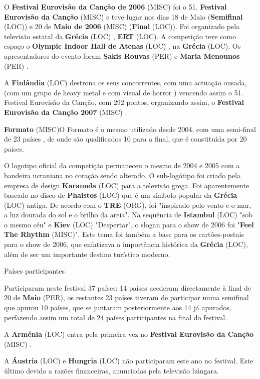 \documentclass[12pt,a4paper]{article}
\begin{document}
O \textbf{Festival Eurovisão da Canção de 2006} (MISC) foi o 51. \textbf{Festival Eurovisão da Canção} (MISC) e teve lugar nos dias 18 de Maio (\textbf{Semifinal} (LOC)) e 20 de \textbf{Maio de 2006} (MISC) (\textbf{Final} (LOC)). Foi organizado pela televisão estatal da \textbf{Grécia} (LOC) , \textbf{ERT} (LOC). A competição teve como espaço o \textbf{Olympic Indoor Hall de Atenas} (LOC) , na \textbf{Grécia} (LOC). Os apresentadores do evento foram \textbf{Sakis Rouvas} (PER) e \textbf{Maria Menounos} (PER) .

A \textbf{Finlândia} (LOC) destrona os seus concorrentes, com uma actuação ousada, (com um grupo de heavy metal e com visual de horror ) vencendo assim o 51. Festival Eurovisão da Canção, com 292 pontos, organizando assim, o \textbf{Festival Eurovisão da Canção 2007} (MISC) .



\textbf{Formato} (MISC)O Formato é o mesmo utilizado desde 2004, com uma semi-final de 23 países , de onde são qualificados 10 para a final, que é constituída por 20 países.

O logotipo oficial da competição permaneceu o mesmo de 2004 e 2005 com a bandeira ucraniana no coração sendo alterado. O sub-logótipo foi criado pela empresa de design \textbf{Karamela} (LOC) para a televisão grega. Foi aparentemente baseado no disco de \textbf{Phaistos} (LOC) que é um símbolo popular da \textbf{Grécia} (LOC) antiga. De acordo com o \textbf{TRE} (ORG), foi "inspirado pelo vento e o mar, a luz dourada do sol e o brilho da areia". Na sequência de \textbf{Istambul} (LOC) "sob o mesmo céu" e \textbf{Kiev} (LOC) "Despertar", o slogan para o show de 2006 foi "\textbf{Feel The Rhythm} (MISC)". Este tema foi também a base para os cartões-postais para o show de 2006, que enfatizava a importância histórica da \textbf{Grécia} (LOC), além de ser um importante destino turístico moderno.



Países participantes

Participaram neste festival 37 países: 14 países acederam directamente à final de 20 de \textbf{Maio} (PER), os restantes 23 países tiveram de participar numa semifinal que apurou 10 países, que se juntaram posteriormente aos 14 já apurados, perfazendo assim um total de 24 países participantes na final do festival.

A \textbf{Arménia} (LOC) entra pela primeira vez no \textbf{Festival Eurovisão da Canção} (MISC) .

A \textbf{Áustria} (LOC) e \textbf{Hungria} (LOC) não participaram este ano no festival. Este último devido a razões financeiras, anunciadas pela televisão húngara.
\end{document}

